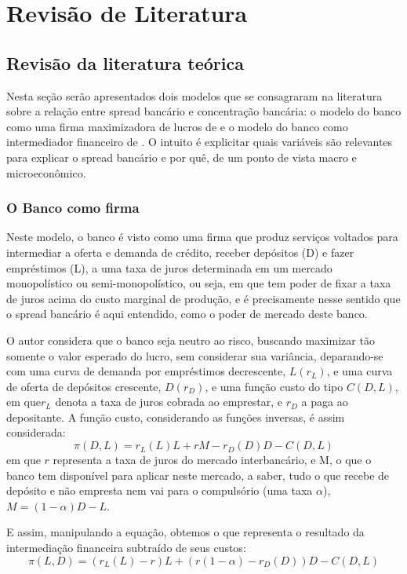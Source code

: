 \documentclass[a4paper,
               article,
               12pt,
               openany,
               oneside,
               english,
               brazil]{abntex2}
\numberwithin{equation}{section}
\begin{document}
\section{Revisão de Literatura}
\subsection{Revisão da literatura teórica}

    Nesta seção serão apresentados dois modelos que se consagraram na literatura sobre a relação entre spread bancário e concentração bancária: o modelo do banco como uma firma maximizadora de lucros de \textcite{klein} e o modelo do banco como intermediador financeiro de \textcite{hoesaunders}. O intuito é explicitar quais variáveis são relevantes para explicar o spread bancário e por quê, de um ponto de vista macro e microeconômico.

\subsubsection{O Banco como firma}

    Neste modelo, o banco é visto como uma firma que produz serviços voltados para intermediar a oferta e demanda de crédito, receber depósitos (D) e fazer empréstimos (L), a uma taxa de juros determinada em um mercado monopolístico ou semi-monopolístico, ou seja, em que tem poder de fixar a taxa de juros acima do custo marginal de produção, e é precisamente nesse sentido que o spread bancário é aqui entendido, como o poder de mercado deste banco. \cite{oreiro}

    O autor considera que o banco seja neutro ao risco, buscando maximizar tão somente o valor esperado do lucro, sem considerar sua variância, deparando-se com uma curva de demanda por empréstimos decrescente, $L(r_L)$, e uma curva de oferta de depósitos crescente, $D(r_D)$, e uma função custo do tipo $C(D, L)$, em que$ r_L$ denota a taxa de juros cobrada ao emprestar, e $r_D$ a paga ao depositante. A função custo, considerando as funções inversas, é assim considerada: \begin{equation}\pi(D, L) = r_L(L)L + rM - r_D(D)D - C(D, L)\end{equation} em que $r$ representa a taxa de juros do mercado interbancário, e M, o que o banco tem disponível para aplicar neste mercado, a saber, tudo o que recebe de depósito e não empresta nem vai para o compulsório (uma taxa $\alpha$), $M = (1 - \alpha)D - L$.

    E assim, manipulando a equação, obtemos o que representa o resultado da intermediação financeira subtraído de seus custos: \begin{equation}\pi(L, D) = (r_L(L) - r)L + (r(1 - \alpha) - r_D(D))D - C(D, L)\end{equation}
\end{document}
